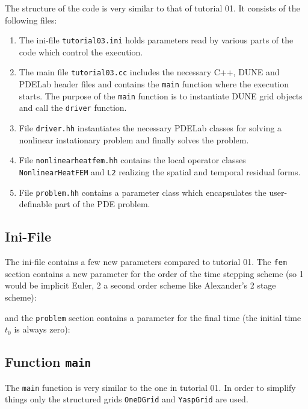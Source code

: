 \documentclass[a4paper,12pt]{article}
\begin{document}
The structure of the code is very similar to that of tutorial 01.
It consists of the following files:
\begin{enumerate}[1)]
\item The ini-file
\lstinline{tutorial03.ini} holds parameters read by various parts of the code
which control the execution.
\item The main file \lstinline{tutorial03.cc} includes the necessary C++,
DUNE and PDELab header files
and contains the \lstinline{main} function where the execution starts.
The purpose of the \lstinline{main} function is
to instantiate DUNE grid objects and call the \lstinline{driver} function.
\item File \lstinline{driver.hh} instantiates the necessary PDELab classes
for solving a nonlinear instationary problem and finally solves the problem.
\item File \lstinline{nonlinearheatfem.hh} contains the local operator classes
\lstinline{NonlinearHeatFEM} and \lstinline{L2} realizing the spatial
and temporal residual forms.
\item File \lstinline{problem.hh} contains a parameter class which
encapsulates the user-definable part of the PDE problem.
\end{enumerate}

\subsection{Ini-File}

The ini-file contains a few new parameters compared to tutorial 01.
The \lstinline{fem} section contains a new parameter for the order of the
time stepping scheme (so 1 would be implicit Euler, 2 a second order
scheme like Alexander's 2 stage scheme):

and the \lstinline{problem} section contains a parameter for the final time (the
initial time $t_0$ is always zero):


\subsection{Function \lstinline{main}}

The \lstinline{main} function is very similar to the one in tutorial 01.
In order to simplify things only the structured grids \lstinline{OneDGrid}
and \lstinline{YaspGrid} are used.
\end{document}
